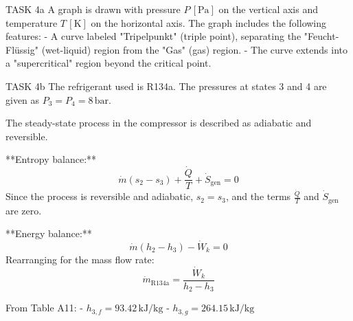TASK 4a  
A graph is drawn with pressure \( P \, [\text{Pa}] \) on the vertical axis and temperature \( T \, [\text{K}] \) on the horizontal axis. The graph includes the following features:  
- A curve labeled "Tripelpunkt" (triple point), separating the "Feucht-Flüssig" (wet-liquid) region from the "Gas" (gas) region.  
- The curve extends into a "supercritical" region beyond the critical point.  

TASK 4b  
The refrigerant used is R134a.  
The pressures at states 3 and 4 are given as \( P_3 = P_4 = 8 \, \text{bar} \).  

The steady-state process in the compressor is described as adiabatic and reversible.  

**Entropy balance:**  
\[
\dot{m} (s_2 - s_3) + \frac{\dot{Q}}{T} + \dot{S}_{\text{gen}} = 0
\]  
Since the process is reversible and adiabatic, \( s_2 = s_3 \), and the terms \( \frac{\dot{Q}}{T} \) and \( \dot{S}_{\text{gen}} \) are zero.  

**Energy balance:**  
\[
\dot{m} (h_2 - h_3) - \dot{W}_k = 0
\]  
Rearranging for the mass flow rate:  
\[
\dot{m}_{\text{R134a}} = \frac{\dot{W}_k}{h_2 - h_3}
\]  

From Table A11:  
- \( h_{3,f} = 93.42 \, \text{kJ/kg} \)  
- \( h_{3,g} = 264.15 \, \text{kJ/kg} \)  